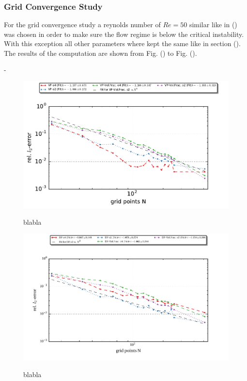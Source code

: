 \subsubsection{Grid Convergence Study}

For the grid convergence study a reynolds number of $Re=50$  similar like in () was chosen in order to make sure the flow regime
is below the critical instability. With this exception all other parameters where kept the same like in section ().
The results of the computation are shown from Fig. () to Fig. ().

-


\newpage
\begin{figure}[!pt]
  \centering
  \includegraphics{gfx/immersed_boundary/tcflow/theo/vp.pdf}\label{fig:hpflow_vpgc_theo}
  \caption{blabla}
\end{figure}

\begin{figure}[!pb]
  \centering
  \includegraphics{gfx/immersed_boundary/tcflow/theo/df.pdf}\label{fig:hpflow_dfgc_theo}
  \caption{blabla}
\end{figure}



